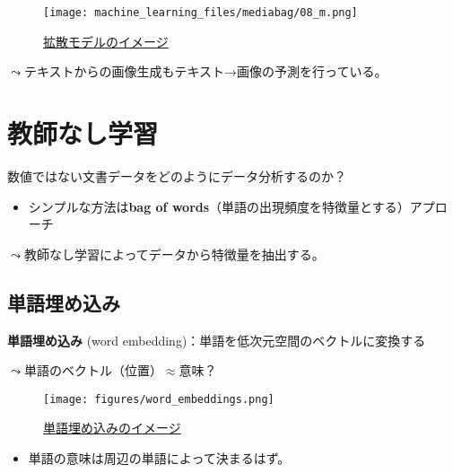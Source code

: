 \documentclass[
  xelatex,
  ja=standard]{bxjsarticle}
\providecommand{\tightlist}{%
  \setlength{\itemsep}{0pt}\setlength{\parskip}{0pt}}\usepackage{longtable,booktabs,array}
\begin{document}
\begin{figure}[htpb]

{\centering \texttt{[image: machine\_learning\_files/mediabag/08\_m.png]}

}

\caption{\href{https://gigazine.net/news/20221006-visuals-explaining-stable-diffusion/}{拡散モデルのイメージ}}

\end{figure}

\(\leadsto\)テキストからの画像生成もテキスト→画像の予測を行っている。

\hypertarget{ux6559ux5e2bux306aux3057ux5b66ux7fd2}{%
\section{教師なし学習}\label{ux6559ux5e2bux306aux3057ux5b66ux7fd2}}

数値ではない文書データをどのようにデータ分析するのか？

\begin{itemize}
\tightlist
\item
  シンプルな方法は\textbf{bag of
  words}（単語の出現頻度を特徴量とする）アプローチ
\end{itemize}

\(\leadsto\)教師なし学習によってデータから特徴量を抽出する。

\hypertarget{ux5358ux8a9eux57cbux3081ux8fbcux307f}{%
\subsection{単語埋め込み}\label{ux5358ux8a9eux57cbux3081ux8fbcux307f}}

\textbf{単語埋め込み} (word
embedding)：単語を低次元空間のベクトルに変換する

\(\leadsto\)単語のベクトル（位置）\(\approx\)意味？

\begin{figure}[htpb]

{\centering \texttt{[image: figures/word\_embeddings.png]}

}

\caption{\href{https://towardsdatascience.com/creating-word-embeddings-coding-the-word2vec-algorithm-in-python-using-deep-learning-b337d0ba17a8}{単語埋め込みのイメージ}}

\end{figure}

\begin{itemize}
\tightlist
\item
  単語の意味は周辺の単語によって決まるはず。
\end{itemize}
\end{document}
